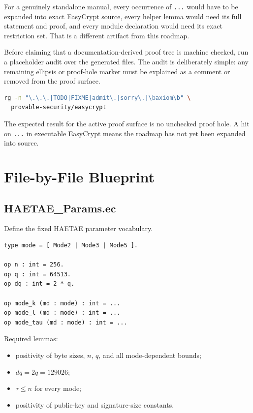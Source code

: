 \documentclass[11pt]{report}
\DeclareRobustCommand{\ec}[1]{\ifmmode\text{\nolinkurl{#1}}\else\nolinkurl{#1}\fi}
\theoremstyle{definition}
\theoremstyle{plain}
\begin{document}
For a genuinely standalone manual, every occurrence of \ec{...} would have to be
expanded into exact EasyCrypt source, every helper lemma would need its full
statement and proof, and every module declaration would need its exact
restriction set.  That is a different artifact from this roadmap.

Before claiming that a documentation-derived proof tree is machine checked, run
a placeholder audit over the generated files.  The audit is deliberately simple:
any remaining ellipsis or proof-hole marker must be explained as a comment or
removed from the proof surface.

\begin{lstlisting}[language=bash]
rg -n "\.\.\.|TODO|FIXME|admit\.|sorry\.|\baxiom\b" \
  provable-security/easycrypt
\end{lstlisting}

The expected result for the active proof surface is no unchecked proof hole.  A
hit on \ec{...} in executable EasyCrypt means the roadmap has not yet been
expanded into source.

\chapter{File-by-File Blueprint}

\section{HAETAE\_Params.ec}

Define the fixed HAETAE parameter vocabulary.

\begin{lstlisting}[language=EasyCrypt]
type mode = [ Mode2 | Mode3 | Mode5 ].

op n : int = 256.
op q : int = 64513.
op dq : int = 2 * q.

op mode_k (md : mode) : int = ...
op mode_l (md : mode) : int = ...
op mode_tau (md : mode) : int = ...
\end{lstlisting}

Required lemmas:

\begin{itemize}
\item positivity of byte sizes, \(n\), \(q\), and all mode-dependent bounds;
\item \(dq=2q=129026\);
\item \(\tau\le n\) for every mode;
\item positivity of public-key and signature-size constants.
\end{itemize}
\end{document}
